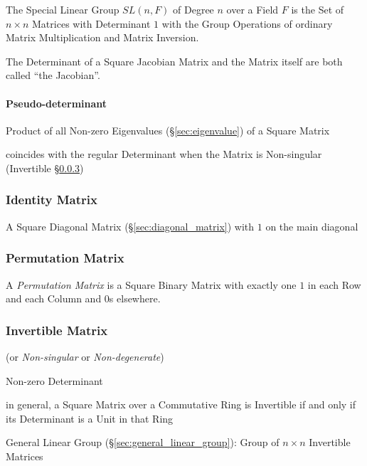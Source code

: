 The Special Linear Group $SL(n,F)$ of Degree $n$ over a Field $F$ is the Set of
$n \times n$ Matrices with Determinant $1$ with the Group Operations of
ordinary Matrix Multiplication and Matrix Inversion.

The Determinant of a Square Jacobian Matrix and the Matrix itself are both
called ``the Jacobian''.



\paragraph{Pseudo-determinant}\label{sec:pseudo_determinant}\hfill

Product of all Non-zero Eigenvalues (\S\ref{sec:eigenvalue}) of a Square Matrix

coincides with the regular Determinant when the Matrix is Non-singular
(Invertible \S\ref{sec:invertible_matrix})



\subsubsection{Identity Matrix}\label{sec:identity_matrix}

A Square Diagonal Matrix (\S\ref{sec:diagonal_matrix}) with $1$ on the main
diagonal



\subsubsection{Permutation Matrix}\label{sec:permutation_matrix}

A \emph{Permutation Matrix} is a Square Binary Matrix with exactly one
$1$ in each Row and each Column and $0$s elsewhere.




\subsubsection{Invertible Matrix}\label{sec:invertible_matrix}

(or \emph{Non-singular} or \emph{Non-degenerate})

Non-zero Determinant

in general, a Square Matrix over a Commutative Ring is Invertible if and only
if its Determinant is a Unit in that Ring

\fist General Linear Group (\S\ref{sec:general_linear_group}): Group of $n
\times n$ Invertible Matrices

